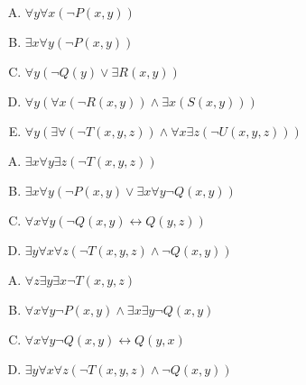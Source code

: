 {{        %
        \begin{practices}
            \begin{enumerate}[A.]
                \item $\forall y \forall x (\neg P(x, y))$
                \item $\exists x \forall y (\neg P(x, y))$
                \item $\forall y (\neg Q(y) \vee \exists R(x, y))$
                \item $\forall y (\forall x (\neg R(x, y)) \wedge \exists x (S(x, y)))$
                \item $\forall y(\exists \forall (\neg T(x, y, z)) \wedge \forall x \exists z (\neg U(x, y, z)))$
            \end{enumerate}
        \end{practices}

        \begin{practices}
            \begin{enumerate}[A.]
                \item $\exists x \forall y \exists z (\neg T(x, y, z))$
                \item $\exists x \forall y (\neg P(x, y) \vee \exists x \forall y \neg Q(x, y))$
                \item $\forall x \forall y (\neg Q(x, y) \leftrightarrow Q(y, z))$
                \item $\exists y \forall x \forall z (\neg T(x, y, z) \wedge \neg Q(x, y))$
            \end{enumerate}
        \end{practices}

        \begin{practices}
            \begin{enumerate}[A.]
                \item $\forall z \exists y \exists x \neg T(x, y, z)$
                \item $\forall x \forall y \neg P(x, y) \wedge \exists x \exists y \neg Q(x, y)$
                \item $\forall x \forall y \neg Q(x, y) \leftrightarrow Q(y, x)$
                \item $\exists y \forall x \forall z (\neg T(x, y, z) \wedge \neg Q(x, y))$
            \end{enumerate}
        \end{practices}

}}
